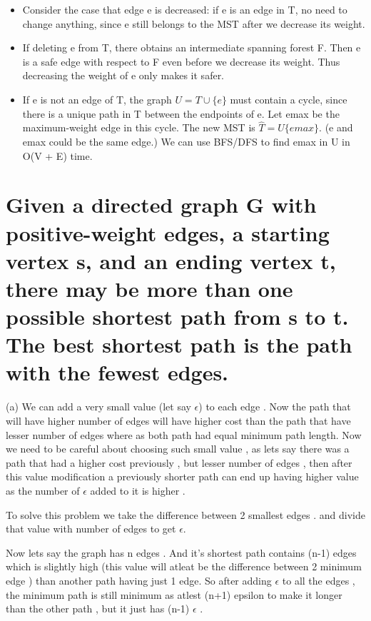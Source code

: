 \documentclass[5pt]{article}
\begin{document}
\setlength{\parskip}{1.2em}
\setlength{\parindent}{0em}
\begin{itemize}
\item Consider the case that edge e is decreased: if e is an edge in T, no need
to change anything, since e still belongs to the MST after we decrease its
weight. 
\item If deleting e from T, there obtains an intermediate spanning forest
F. Then e is a safe edge with respect to F even before we decrease its
weight. Thus decreasing the weight of e only makes it safer.

\item If e is not an edge of T, the graph $U = T \cup \{e\}$ must contain a cycle, since
there is a unique path in T between the endpoints of e. Let emax be the
maximum-weight edge in this cycle. The new MST is $ \hat{T}  = U \{emax\}.$ (e
and emax could be the same edge.)
We can use BFS/DFS to find emax in U in O(V + E) time. \cite{prevgraph}

\end{itemize}

\section{ Given a directed graph G with positive-weight edges, a starting vertex s, and an ending vertex t, there
may be more than one possible shortest path from s to t. The best shortest path is the path with the
fewest edges.}

\setlength{\parskip}{1.2em}
\setlength{\parindent}{0em}

(a) We can add a very small value (let say $\epsilon$) to each edge . Now the path that will have higher number of edges will have higher cost than the path that have lesser number of edges where as both path had equal minimum path length.
Now we need to be careful about choosing such small value , as lets say there was a path that had a higher cost previously , but lesser number of edges , then after this value modification a previously shorter path can end up having higher value as the number of $\epsilon$ added to it is higher .

To solve this problem we take the difference between 2 smallest edges . and divide that value with number of edges to get $\epsilon$. 

Now lets say the graph has n edges . And it's shortest path contains (n-1) edges which is slightly high (this value will atleat be the difference between 2 minimum edge ) than another path having just 1 edge. So after adding $\epsilon$ to all the edges , the minimum path is still minimum as atlest (n+1) epsilon to make it longer than the other path , but it just has (n-1) $\epsilon$ .
\end{document}
